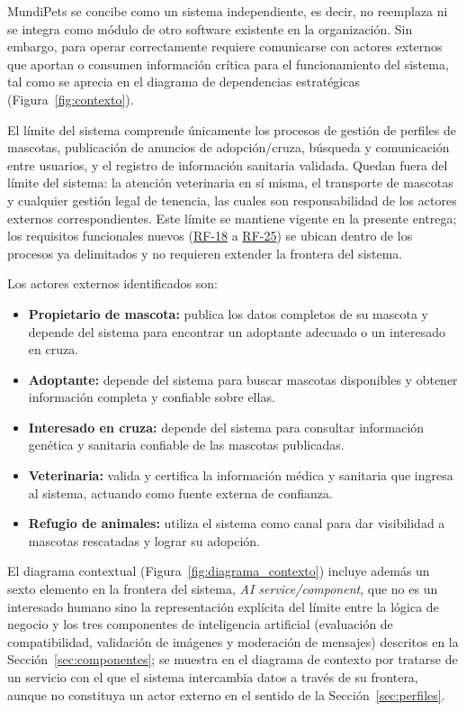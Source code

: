 \documentclass[journal,onecolumn]{IEEEtran}
\begin{document}
	MundiPets se concibe como un sistema independiente, es decir, no reemplaza ni
	se integra como módulo de otro software existente en la organización. Sin
	embargo, para operar correctamente requiere comunicarse con actores externos
	que aportan o consumen información crítica para el funcionamiento del sistema,
	tal como se aprecia en el diagrama de dependencias estratégicas
	(Figura~\ref{fig:contexto}).
	
	El límite del sistema comprende únicamente los procesos de gestión de perfiles
	de mascotas, publicación de anuncios de adopción/cruza, búsqueda y
	comunicación entre usuarios, y el registro de información sanitaria validada.
	Quedan fuera del límite del sistema: la atención veterinaria en sí misma, el
	transporte de mascotas y cualquier gestión legal de tenencia, las cuales son
	responsabilidad de los actores externos correspondientes. Este límite se
	mantiene vigente en la presente entrega; los requisitos funcionales nuevos
	(\hyperref[tab:RF-18]{RF-18} a \hyperref[tab:RF-25]{RF-25}) se ubican dentro de los procesos ya delimitados y no
	requieren extender la frontera del sistema.
	
	Los actores externos identificados son:
	\begin{itemize}[leftmargin=*]
		\item \textbf{Propietario de mascota:} publica los datos completos de su mascota y depende del sistema para encontrar un adoptante adecuado o un interesado en cruza.
		\item \textbf{Adoptante:} depende del sistema para buscar mascotas disponibles y obtener información completa y confiable sobre ellas.
		\item \textbf{Interesado en cruza:} depende del sistema para consultar información genética y sanitaria confiable de las mascotas publicadas.
		\item \textbf{Veterinaria:} valida y certifica la información médica y sanitaria que ingresa al sistema, actuando como fuente externa de confianza.
		\item \textbf{Refugio de animales:} utiliza el sistema como canal para dar visibilidad a mascotas rescatadas y lograr su adopción.
	\end{itemize}

	El diagrama contextual (Figura~\ref{fig:diagrama_contexto}) incluye
	además un sexto elemento en la frontera del sistema, \emph{AI
	service/component}, que no es un interesado humano sino la
	representación explícita del límite entre la lógica de negocio y los
	tres componentes de inteligencia artificial (evaluación de
	compatibilidad, validación de imágenes y moderación de mensajes)
	descritos en la Sección~\ref{sec:componentes}; se muestra en el diagrama
	de contexto por tratarse de un servicio con el que el sistema
	intercambia datos a través de su frontera, aunque no constituya un
	actor externo en el sentido de la Sección~\ref{sec:perfiles}.
	
\end{document}
